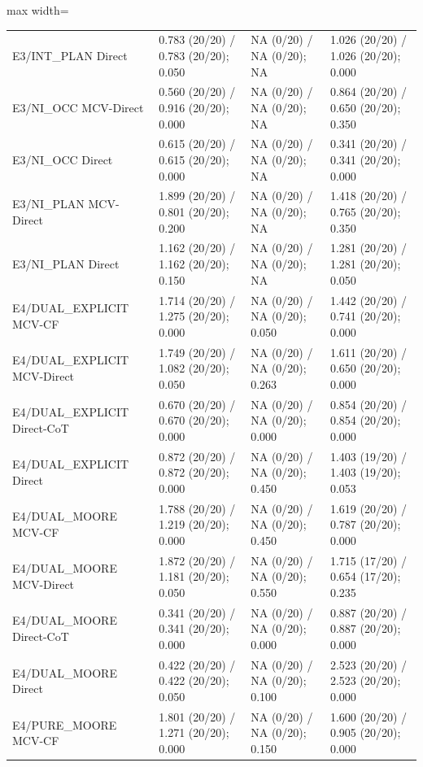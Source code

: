 \documentclass[11pt,a4paper]{article}
\begin{document}
\begin{center}
\begin{adjustbox}{max width=\textwidth}
\begin{tabular}{llll}
E3/INT\_\allowbreak{}PLAN Direct & 0.783 (20/20) / 0.783 (20/20); 0.050 & NA (0/20) / NA (0/20); NA & 1.026 (20/20) / 1.026 (20/20); 0.000 \\
E3/NI\_\allowbreak{}OCC MCV-Direct & 0.560 (20/20) / 0.916 (20/20); 0.000 & NA (0/20) / NA (0/20); NA & 0.864 (20/20) / 0.650 (20/20); 0.350 \\
E3/NI\_\allowbreak{}OCC Direct & 0.615 (20/20) / 0.615 (20/20); 0.000 & NA (0/20) / NA (0/20); NA & 0.341 (20/20) / 0.341 (20/20); 0.000 \\
E3/NI\_\allowbreak{}PLAN MCV-Direct & 1.899 (20/20) / 0.801 (20/20); 0.200 & NA (0/20) / NA (0/20); NA & 1.418 (20/20) / 0.765 (20/20); 0.350 \\
E3/NI\_\allowbreak{}PLAN Direct & 1.162 (20/20) / 1.162 (20/20); 0.150 & NA (0/20) / NA (0/20); NA & 1.281 (20/20) / 1.281 (20/20); 0.050 \\
E4/DUAL\_\allowbreak{}EXPLICIT MCV-CF & 1.714 (20/20) / 1.275 (20/20); 0.000 & NA (0/20) / NA (0/20); 0.050 & 1.442 (20/20) / 0.741 (20/20); 0.000 \\
E4/DUAL\_\allowbreak{}EXPLICIT MCV-Direct & 1.749 (20/20) / 1.082 (20/20); 0.050 & NA (0/20) / NA (0/20); 0.263 & 1.611 (20/20) / 0.650 (20/20); 0.000 \\
E4/DUAL\_\allowbreak{}EXPLICIT Direct-CoT & 0.670 (20/20) / 0.670 (20/20); 0.000 & NA (0/20) / NA (0/20); 0.000 & 0.854 (20/20) / 0.854 (20/20); 0.000 \\
E4/DUAL\_\allowbreak{}EXPLICIT Direct & 0.872 (20/20) / 0.872 (20/20); 0.000 & NA (0/20) / NA (0/20); 0.450 & 1.403 (19/20) / 1.403 (19/20); 0.053 \\
E4/DUAL\_\allowbreak{}MOORE MCV-CF & 1.788 (20/20) / 1.219 (20/20); 0.000 & NA (0/20) / NA (0/20); 0.450 & 1.619 (20/20) / 0.787 (20/20); 0.000 \\
E4/DUAL\_\allowbreak{}MOORE MCV-Direct & 1.872 (20/20) / 1.181 (20/20); 0.050 & NA (0/20) / NA (0/20); 0.550 & 1.715 (17/20) / 0.654 (17/20); 0.235 \\
E4/DUAL\_\allowbreak{}MOORE Direct-CoT & 0.341 (20/20) / 0.341 (20/20); 0.000 & NA (0/20) / NA (0/20); 0.000 & 0.887 (20/20) / 0.887 (20/20); 0.000 \\
E4/DUAL\_\allowbreak{}MOORE Direct & 0.422 (20/20) / 0.422 (20/20); 0.050 & NA (0/20) / NA (0/20); 0.100 & 2.523 (20/20) / 2.523 (20/20); 0.000 \\
E4/PURE\_\allowbreak{}MOORE MCV-CF & 1.801 (20/20) / 1.271 (20/20); 0.000 & NA (0/20) / NA (0/20); 0.150 & 1.600 (20/20) / 0.905 (20/20); 0.000 \\

\end{tabular}
\end{adjustbox}
\end{center}
\end{document}
